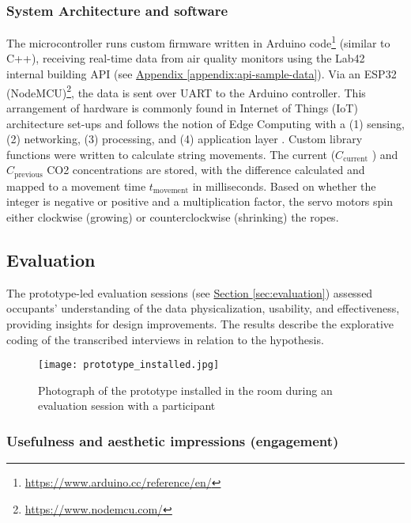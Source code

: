 \subsubsection{System Architecture and software}

The microcontroller runs custom firmware written in Arduino code\footnote{\url{https://www.arduino.cc/reference/en/}} (similar to C++), receiving real-time data from air quality monitors using the Lab42 internal building API (see \hyperref[appendix:api-sample-data]{Appendix \ref*{appendix:api-sample-data}}). Via an ESP32 (NodeMCU)\footnote{\url{https://www.nodemcu.com/}}, the data is sent over UART to the Arduino controller. This arrangement of hardware is commonly found in Internet of Things (IoT) architecture set-ups and follows the notion of Edge Computing with a (1) sensing, (2) networking, (3) processing, and (4) application layer \cite{li_edge-oriented_2019, idrees_edge_2018}. Custom library functions were written to calculate string movements. The current (\( C_{\text{current}} \) ) and \( C_{\text{previous}} \) CO2 concentrations are stored, with the difference calculated and mapped to a movement time \( t_{\text{movement}} \) in milliseconds. Based on whether the integer is negative or positive and a multiplication factor, the servo motors spin either clockwise (growing) or counterclockwise (shrinking) the ropes.


\subsection{Evaluation}
\label{sec:evaluation_results}

The prototype-led evaluation sessions (see \hyperref[sec:evaluation]{Section \ref*{sec:evaluation}}) assessed occupants' understanding of the data physicalization, usability, and effectiveness, providing insights for design improvements. The results describe the explorative coding of the transcribed interviews in relation to the hypothesis.


\begin{figure}[b]
    \centering
    \texttt{[image: prototype\_installed.jpg]}
    \caption{Photograph of the prototype installed in the room during an evaluation session with a participant }
    \label{fig:photograph-prototype}
\end{figure}

\subsubsection{Usefulness and aesthetic impressions (engagement)}

